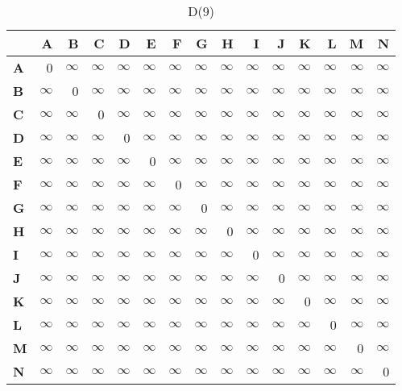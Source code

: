 \documentclass{article}
\newcommand{\INF}{$\infty$}
\begin{document}
\begin{table}[H]\centering
\caption{D(9)}
\begin{tabular}{l r r r r r r r r r r r r r r}
\toprule
 & \textbf{A} & \textbf{B} & \textbf{C} & \textbf{D} & \textbf{E} & \textbf{F} & \textbf{G} & \textbf{H} & \textbf{I} & \textbf{J} & \textbf{K} & \textbf{L} & \textbf{M} & \textbf{N}\\\midrule
\textbf{A} & 0 & \INF & \INF & \INF & \INF & \INF & \INF & \INF & \INF & \INF & \INF & \INF & \INF & \INF \\
\textbf{B} & \INF & 0 & \INF & \INF & \INF & \INF & \INF & \INF & \INF & \INF & \INF & \INF & \INF & \INF \\
\textbf{C} & \INF & \INF & 0 & \INF & \INF & \INF & \INF & \INF & \INF & \INF & \INF & \INF & \INF & \INF \\
\textbf{D} & \INF & \INF & \INF & 0 & \INF & \INF & \INF & \INF & \INF & \INF & \INF & \INF & \INF & \INF \\
\textbf{E} & \INF & \INF & \INF & \INF & 0 & \INF & \INF & \INF & \INF & \INF & \INF & \INF & \INF & \INF \\
\textbf{F} & \INF & \INF & \INF & \INF & \INF & 0 & \INF & \INF & \INF & \INF & \INF & \INF & \INF & \INF \\
\textbf{G} & \INF & \INF & \INF & \INF & \INF & \INF & 0 & \INF & \INF & \INF & \INF & \INF & \INF & \INF \\
\textbf{H} & \INF & \INF & \INF & \INF & \INF & \INF & \INF & 0 & \INF & \INF & \INF & \INF & \INF & \INF \\
\textbf{I} & \INF & \INF & \INF & \INF & \INF & \INF & \INF & \INF & 0 & \INF & \INF & \INF & \INF & \INF \\
\textbf{J} & \INF & \INF & \INF & \INF & \INF & \INF & \INF & \INF & \INF & 0 & \INF & \INF & \INF & \INF \\
\textbf{K} & \INF & \INF & \INF & \INF & \INF & \INF & \INF & \INF & \INF & \INF & 0 & \INF & \INF & \INF \\
\textbf{L} & \INF & \INF & \INF & \INF & \INF & \INF & \INF & \INF & \INF & \INF & \INF & 0 & \INF & \INF \\
\textbf{M} & \INF & \INF & \INF & \INF & \INF & \INF & \INF & \INF & \INF & \INF & \INF & \INF & 0 & \INF \\
\textbf{N} & \INF & \INF & \INF & \INF & \INF & \INF & \INF & \INF & \INF & \INF & \INF & \INF & \INF & 0 \\
\bottomrule
\end{tabular}
\end{table}
\end{document}
